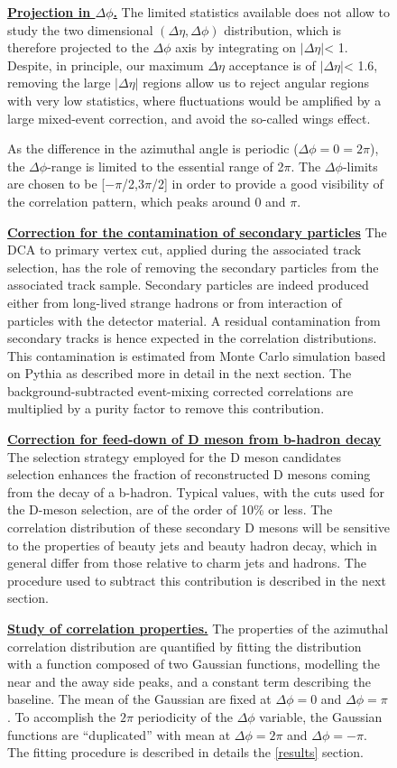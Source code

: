 \begin{enumerate}
\begin{figure}
\item
\underline {\bf Projection in $\Delta\phi$.}
The limited statistics available does not allow to study the two dimensional
$(\Delta\eta,\Delta\phi)$ distribution, which is therefore projected to the $\Delta\phi$ axis by integrating on $|\Delta\eta|$< 1. Despite, in principle, our maximum $\Delta\eta$ acceptance is of $|\Delta\eta|$< 1.6, removing the large $|\Delta\eta|$ regions allow us to reject angular regions with very low statistics, where fluctuations would be amplified by a large mixed-event correction, and avoid the so-called wings effect.

As the difference in the azimuthal angle is periodic ($\Delta \phi = 0 = 2\pi$), the $\Delta\phi$-range is limited to the essential range of 2$\pi$. The $\Delta \phi$-limits are chosen to be [$-\pi$/2,3$\pi$/2] in order to provide a good visibility of the correlation pattern, which peaks around 0 and $\pi$.

\item
\underline {\bf Correction for the contamination of secondary particles}
The DCA to primary vertex cut, applied during the associated track selection, has the role of removing the secondary particles from the associated track sample.
Secondary particles are indeed produced either from long-lived strange hadrons or from interaction of particles with the detector material. A residual contamination from secondary tracks is hence expected in the correlation distributions. This contamination is estimated from Monte Carlo simulation
based on Pythia as described more in detail in the next section. The background-subtracted
event-mixing corrected correlations are multiplied by a purity factor to remove this contribution.

\item
\underline {\bf Correction for feed-down of D meson from b-hadron decay}
The selection strategy employed for the D meson candidates selection %
enhances the fraction of reconstructed D mesons coming from the decay of a b-hadron. Typical values, with the cuts used for the D-meson selection, are of the order of 10\% or less. The correlation distribution of these secondary D mesons will be sensitive to the properties of beauty jets and beauty hadron decay, which in general differ from those relative to charm jets and hadrons. The procedure used to subtract this contribution is described in the next section.

\item
\underline{\bf Study of correlation properties.}
The properties of the azimuthal correlation distribution are quantified by
fitting the distribution with a function composed of two Gaussian functions, modelling the near and the away side peaks, and
a constant term describing the baseline. The mean of the Gaussian are fixed at
$\Delta\phi = 0$ and $\Delta\phi = \pi$. To accomplish the $2\pi$ periodicity
of the $\Delta\phi$ variable, the Gaussian functions
are ``duplicated'' with mean at $\Delta\phi = 2\pi$ and $\Delta\phi = -\pi$.
The fitting procedure is described in details the \ref{results} section.



\end{figure}
\end{enumerate}
